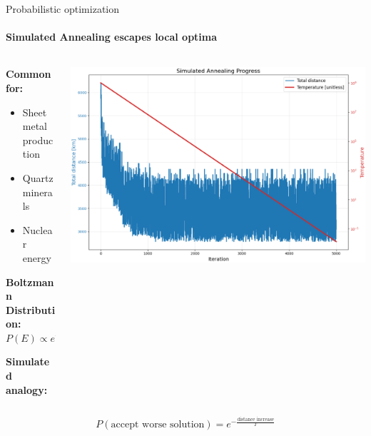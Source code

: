 \documentclass{beamer}
\begin{document}
\begin{frame}{Probabilistic optimization}
  \framesubtitle{Simulated Annealing escapes local optima}

  \begin{columns}[c]
    \begin{column}{0.4\textwidth}
      \textbf{Common for:}

      \begin{itemize}
        \item Sheet metal production
        \item Quartz minerals
        \item Nuclear energy
      \end{itemize}

      \vspace{0.5cm}

      \textbf{Boltzmann Distribution:}
      $$P(E) \propto e^{-\frac{E}{k_B T}}$$

      \textbf{Simulated analogy:}
    \end{column}
    \begin{column}{0.6\textwidth}
      \includegraphics[width=\textwidth]{images/annealing-history.png}
    \end{column}
  \end{columns}

  \vspace{0.5cm}

  $$P(\text{accept worse solution}) = e^{-\frac{\text{distance increase}}{T}}$$
\end{frame}
\end{document}
